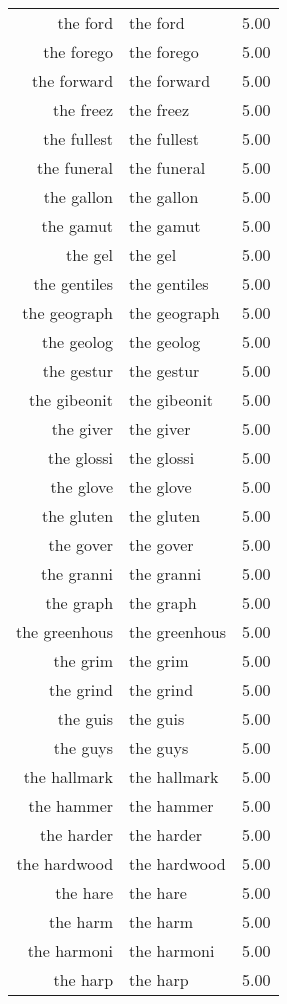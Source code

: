 \begin{table}[ht]
\begin{tabular}{rlr}
  the ford & the ford & 5.00 \\ 
  the forego & the forego & 5.00 \\ 
  the forward & the forward & 5.00 \\ 
  the freez & the freez & 5.00 \\ 
  the fullest & the fullest & 5.00 \\ 
  the funeral & the funeral & 5.00 \\ 
  the gallon & the gallon & 5.00 \\ 
  the gamut & the gamut & 5.00 \\ 
  the gel & the gel & 5.00 \\ 
  the gentiles & the gentiles & 5.00 \\ 
  the geograph & the geograph & 5.00 \\ 
  the geolog & the geolog & 5.00 \\ 
  the gestur & the gestur & 5.00 \\ 
  the gibeonit & the gibeonit & 5.00 \\ 
  the giver & the giver & 5.00 \\ 
  the glossi & the glossi & 5.00 \\ 
  the glove & the glove & 5.00 \\ 
  the gluten & the gluten & 5.00 \\ 
  the gover & the gover & 5.00 \\ 
  the granni & the granni & 5.00 \\ 
  the graph & the graph & 5.00 \\ 
  the greenhous & the greenhous & 5.00 \\ 
  the grim & the grim & 5.00 \\ 
  the grind & the grind & 5.00 \\ 
  the guis & the guis & 5.00 \\ 
  the guys & the guys & 5.00 \\ 
  the hallmark & the hallmark & 5.00 \\ 
  the hammer & the hammer & 5.00 \\ 
  the harder & the harder & 5.00 \\ 
  the hardwood & the hardwood & 5.00 \\ 
  the hare & the hare & 5.00 \\ 
  the harm & the harm & 5.00 \\ 
  the harmoni & the harmoni & 5.00 \\ 
  the harp & the harp & 5.00 \\ 

\end{tabular}
\end{table}
